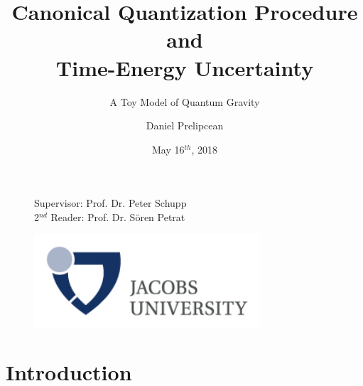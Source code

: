 \documentclass[handout, 10pt]{beamer}  %
\title[A Toy Model of Quantum Gravity]{Canonical Quantization Procedure and \\ Time-Energy Uncertainty} %
\subtitle{A Toy Model of Quantum Gravity}
\author[Daniel Prelipcean]{Daniel Prelipcean} %
\institute[JUB Physics BSc Thesis Colloquium] %
{Physics BSc Thesis Colloquium}
\date{May 16$^{th}$, 2018} %
\begin{document}
\begin{frame}
\titlepage %

\begin{figure}[H]
  \centering
  \begin{minipage}[H]{0.59\textwidth}
    \raggedright
    
    {\small Supervisor: Prof. Dr. Peter Schupp\\
    2$^{nd}$ Reader: Prof. Dr. S{\"o}ren Petrat }
  \end{minipage}
  \hfill
  \begin{minipage}[H]{0.39\textwidth}
    \raggedleft
    \includegraphics[width=0.75\textwidth]{Figs/JACOBS_LOGO.jpg}
\end{minipage}
\end{figure}




\end{frame}




\section{Introduction} %


\end{document}

